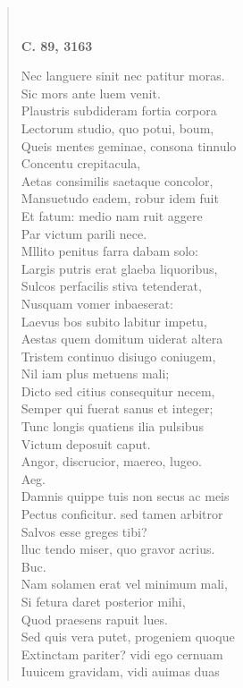 \documentclass[11pt, a4paper]{report}
\begin{document}
\begin{verse}
        ﻿\pagebreak 
     \marginpar{[336]} \begin{center} \textbf{C. 89, 3163} \end{center}Nec languere sinit nec patitur moras. \\ Sic mors ante luem venit. \\ Plaustris subdideram fortia corpora \\ Lectorum studio, quo potui, boum, \\ Queis mentes geminae, consona tinnulo \\ Concentu crepitacula, \\ Aetas consimilis saetaque concolor, \\ Mansuetudo eadem, robur idem fuit \\ Et fatum: medio nam ruit aggere \\ Par victum parili nece. \\ Mllito penitus farra dabam solo: \\ Largis putris erat glaeba liquoribus, \\ Sulcos perfacilis stiva tetenderat, \\ Nusquam vomer inbaeserat: \\ Laevus bos subito labitur impetu, \\ Aestas quem domitum uiderat altera \\ Tristem continuo disiugo coniugem, \\ Nil iam plus metuens mali; \\ Dicto sed citius consequitur necem, \\ Semper qui fuerat  \lbrack sanus \rbrack  et integer; \\ Tunc longis quatiens ilia pulsibus \\ Victum deposuit caput. \\ Angor, discrucior, maereo, lugeo. \\ Aeg. \\ Damnis quippe tuis non secus ac meis \\ Pectus conficitur. sed tamen arbitror \\ Salvos esse greges tibi? \\ lluc tendo miser, quo gravor acrius. \\ Buc. \\ Nam solamen erat vel minimum mali, \\ Si fetura daret posterior mihi, \\ Quod praesens rapuit lues. \\ Sed quis vera putet, progeniem quoque \\ Extinctam pariter? vidi ego cernuam \\ Iuuicem gravidam, vidi auimas duas \\ 

\end{verse}
\end{document}
